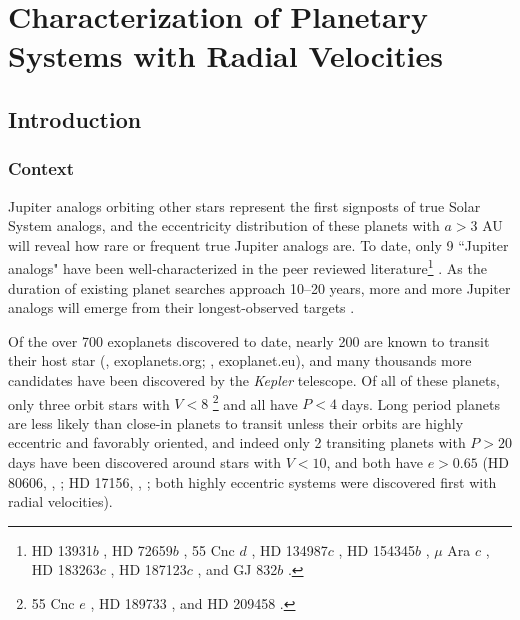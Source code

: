\chapter{Characterization of Planetary Systems with Radial Velocities}

\section{Introduction}\label{sec:intro}

\subsection{Context}

Jupiter analogs orbiting other stars represent the first signposts of
true Solar System analogs, and the eccentricity distribution of these
planets with $a>3$ AU will reveal how rare or frequent true Jupiter
analogs are. To date, only 9 ``Jupiter analogs" have been
well-characterized in the peer reviewed literature\footnote{HD
  13931$b$ \citep{2010ApJ...721.1467H}, HD 72659$b$
  \citep{2011A&A...527A..63M}, 55 Cnc $d$ \citep{2002ApJ...581.1375M},
  HD 134987$c$ \citep{2010MNRAS.403.1703J}, HD 154345$b$ \citep[but
    with possibility of being an activity cycle-induced
    signal]{2008ApJ...683L..63W}, $\mu$ Ara $c$
  \citep{2007A&A...462..769P}, HD 183263$c$
  \citep{2009ApJ...693.1084W}, HD 187123$c$
  \citep{2009ApJ...693.1084W}, and GJ 832$b$
  \citep{2009ApJ...690..743B}.}  \citep[defined here as $P > 8$ years,
  $4 > M\sin{i} > 0.5\ \mjup$, and $e <
  0.3$;][exoplanets.org]{wrighteod}. As the duration of existing
planet searches approach 10--20 years, more and more Jupiter analogs
will emerge from their longest-observed targets
\citep{2012arXiv1205.2765W, 2012arXiv1205.5835B}.

Of the over 700 exoplanets discovered to date, nearly 200 are known to
transit their host star (\citealt{wrighteod}, exoplanets.org;
  \citealt{2011A&A...532A..79S}, exoplanet.eu), and many thousands more
candidates have been discovered by the {\it Kepler} telescope.  Of all
of these planets, only three orbit stars with $V<8$
\footnote{55 Cnc $e$ \citep{2004ApJ...614L..81M, 2011A&A...533A.114D},
  HD 189733 \citep{2005A&A...444L..15B}, and HD 209458
  \citep{2000ApJ...529L..41H, 2000ApJ...529L..45C}.}  and all have $P
< 4$ days.  Long period planets are less likely than close-in planets
to transit unless their orbits are highly eccentric and favorably
oriented, and indeed only 2 transiting planets with $P>20$ days have
been discovered around stars with $V<10$, and both have $e > 0.65$ (HD
  80606, \citealt{2009Natur.457..562L}, \citealt{2009MNRAS.396L..16F}; HD
  17156, \citealt{2007ApJ...669.1336F}, \citealt{2007A&A...476L..13B}; both
  highly eccentric systems were discovered first with radial
  velocities).

